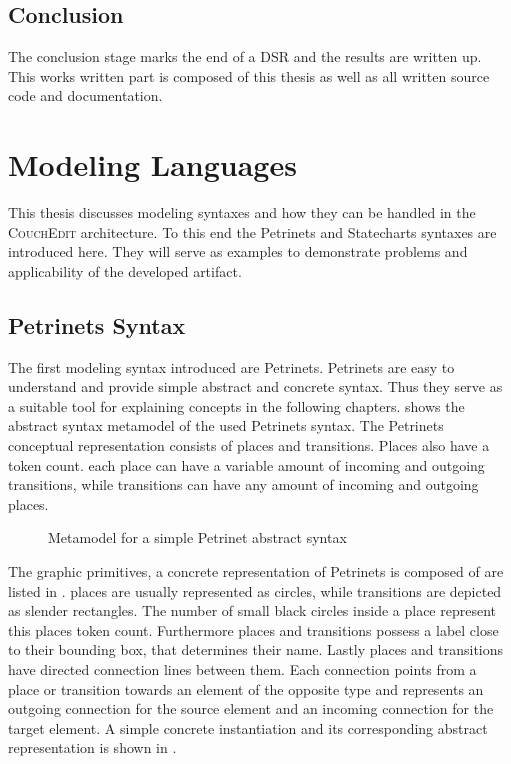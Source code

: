 \subsection{Conclusion}
The conclusion stage marks the end of a DSR and the results are written up. This works written part is composed of this thesis as well as all written source code and documentation.


\section{Modeling Languages}
\label{sec:modeling-languages}
This thesis discusses modeling syntaxes and how they can be handled in the \textsc{CouchEdit} architecture. To this end the Petrinets and Statecharts syntaxes are introduced here. They will serve as examples to demonstrate problems and applicability of the developed artifact. 

\subsection{Petrinets Syntax}
\label{sec:petrinets}
The first modeling syntax introduced are Petrinets. Petrinets are easy to understand and provide simple abstract and concrete syntax. Thus they serve as a suitable tool for explaining concepts in the following chapters.  shows the abstract syntax metamodel of the used Petrinets syntax. The Petrinets conceptual representation consists of places and transitions. Places also have a token count. each place can have a variable amount of incoming and outgoing transitions, while transitions can have any amount of incoming and outgoing places. 

\begin{figure}[H]
  \centering
  
  \caption{Metamodel for a simple Petrinet abstract syntax}
  \label{fig:petrinets_metamodel}
\end{figure}

The graphic primitives, a concrete representation of Petrinets is composed of are listed in . places are usually represented as circles, while transitions are depicted as slender rectangles. The number of small black circles inside a place represent this places token count. Furthermore places and transitions possess a label close to their bounding box, that determines their name. Lastly places and transitions have directed connection lines between them. Each connection points from a place or transition towards an element of the opposite type and represents an outgoing connection for the source element and an incoming connection for the target element. A simple concrete instantiation and its corresponding abstract representation is shown in .

